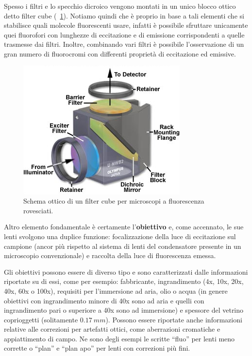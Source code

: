 Spesso i filtri e lo specchio dicroico vengono montati in un unico blocco ottico detto filter cube (\figurename~\ref{fig:cube}). 
Notiamo quindi che è proprio in base a tali elementi che si stabilisce quali molecole fluorescenti usare, infatti è possibile sfruttare unicamente quei fluorofori con lunghezze di eccitazione e di emissione corrispondenti a quelle trasmesse dai filtri. 
Inoltre, combinando vari filtri è possibile l'osservazione di un gran numero di fluorocromi con differenti proprietà di eccitazione ed emissive.

\begin{figure}
 \centering
 \includegraphics[scale=.50]{img/CAP2cube.jpg}
 \caption{\small{Schema ottico di un filter cube per microscopi a fluorescenza rovesciati.}}
 \label{fig:cube}
\end{figure}

Altro elemento fondamentale è certamente l'\textbf{obiettivo} e, come accennato, le sue lenti svolgono una duplice funzione: focalizzazione della luce di eccitazione sul campione (ancor più rispetto al sistema di lenti del condensatore presente in un microscopio convenzionale) e raccolta della luce di fluorescenza emessa. 

Gli obiettivi possono essere di diverso tipo e sono caratterizzati dalle informazioni riportate su di essi, come per esempio: fabbricante, ingrandimento (4x, 10x, 20x, 40x, 60x o 100x), requisiti per l'immersione ad aria, olio o acqua (in genere obiettivi con ingrandimento minore di 40x sono ad aria e quelli con ingrandimento pari o superiore a 40x sono ad immersione) e spessore del vetrino coprioggetti (solitamente $0.17\ mm$).  
Possono essere riportate anche informazioni relative alle correzioni per artefatti ottici, come aberrazioni cromatiche e appiattimento di campo.
Ne sono degli esempi le scritte ``fluo'' per lenti meno corrette o ``plan'' e ``plan apo'' per lenti con correzioni più fini. 

